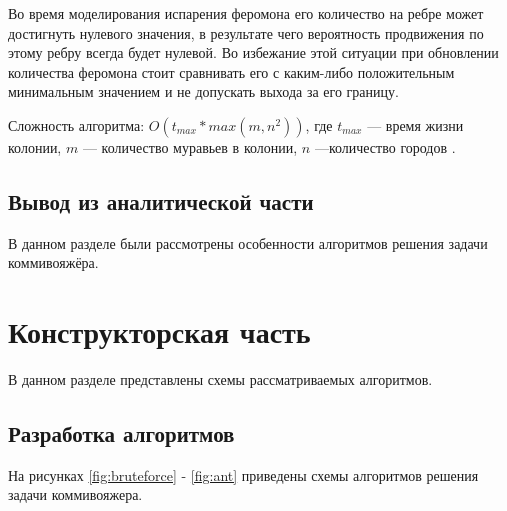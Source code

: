 \documentclass[12pt]{report}
\begin{document}
Во время моделирования испарения феромона его количество на ребре может достигнуть нулевого значения, в результате чего вероятность продвижения по этому ребру всегда будет нулевой. Во избежание этой ситуации при обновлении количества феромона стоит сравнивать его с каким-либо положительным  минимальным значением и не допускать выхода за его границу.

Сложность алгоритма: $O(t_{max} * max(m, n^2))$, где $t_{max}$ --- время жизни колонии, $m$ --- количество муравьев в колонии, $n$ ---количество городов \cite{ulyanov}.

\section{Вывод из аналитической части}
В данном разделе были рассмотрены особенности алгоритмов решения задачи коммивояжёра.

\chapter{Конструкторская часть}
	
В данном разделе представлены схемы рассматриваемых алгоритмов.
	
\section{Разработка алгоритмов}
	
На рисунках \ref{fig:bruteforce} - \ref{fig:ant} приведены схемы алгоритмов решения задачи коммивояжера.
\end{document}
